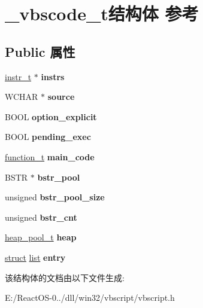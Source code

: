 \hypertarget{struct__vbscode__t}{}\section{\+\_\+vbscode\+\_\+t结构体 参考}
\label{struct__vbscode__t}
\subsection*{Public 属性}
\begin{DoxyCompactItemize}
\item 
\mbox{\label{struct__vbscode__t_a28e54660aa44663f0075f64c04a1db66}} 
\hyperlink{structinstr__t}{instr\+\_\+t} $\ast$ {\bfseries instrs}
\item 
\mbox{\label{struct__vbscode__t_ac437b183889b92871472f72a15880f4e}} 
W\+C\+H\+AR $\ast$ {\bfseries source}
\item 
\mbox{\label{struct__vbscode__t_afb12f3111cfd8082ad90604faeab2675}} 
B\+O\+OL {\bfseries option\+\_\+explicit}
\item 
\mbox{\label{struct__vbscode__t_a579cabbcb907db5ac52dcc5025ee4da7}} 
B\+O\+OL {\bfseries pending\+\_\+exec}
\item 
\mbox{\label{struct__vbscode__t_a4075be1b3292039c9ee1d8d57aa3bbfc}} 
\hyperlink{struct__function__t}{function\+\_\+t} {\bfseries main\+\_\+code}
\item 
\mbox{\label{struct__vbscode__t_aa84d45555882f0f8e460d0fb9794d111}} 
B\+S\+TR $\ast$ {\bfseries bstr\+\_\+pool}
\item 
\mbox{\label{struct__vbscode__t_ac0d733e1e5580f7aa0ab23fb8887b14b}} 
unsigned {\bfseries bstr\+\_\+pool\+\_\+size}
\item 
\mbox{\label{struct__vbscode__t_a8863bda84a5237d2389c80c66c05ef11}} 
unsigned {\bfseries bstr\+\_\+cnt}
\item 
\mbox{\label{struct__vbscode__t_a040d172f49f853f6141577fd90ed8071}} 
\hyperlink{structheap__pool__t}{heap\+\_\+pool\+\_\+t} {\bfseries heap}
\item 
\mbox{\label{struct__vbscode__t_af396a4556941f031558b95a55ff06675}} 
\hyperlink{interfacestruct}{struct} \hyperlink{classlist}{list} {\bfseries entry}
\end{DoxyCompactItemize}


该结构体的文档由以下文件生成\+:\begin{DoxyCompactItemize}
\item 
E\+:/\+React\+O\+S-\/0../dll/win32/vbscript/vbscript.\+h\end{DoxyCompactItemize}

